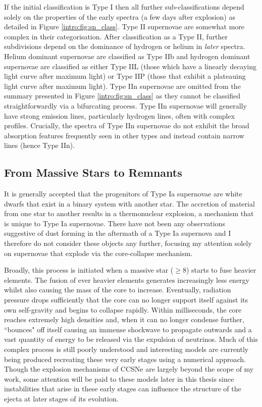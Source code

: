 If the initial classification is Type I then all further sub-classifications depend solely on the properties of the early spectra (a few days after explosion) as detailed in Figure \ref{intro:fig:sn_class}.  Type II supernovae are somewhat more complex in their categorisation.  After classification as a Type II, further subdivisions depend on the dominance of hydrogen or helium in \textit{later} spectra.  Helium dominant supernovae are classified as Type IIb and hydrogen dominant supernovae are classified as either Type IIL (those which have a linearly decaying light curve after maximum light) or Type IIP (those that exhibit a plateauing light curve after maximum light).  Type IIn supernovae are omitted from the summary presented in Figure \ref{intro:fig:sn_class} as they cannot be classified straightforwardly via a bifurcating process.  Type IIn supernovae will generally have strong emission lines, particularly hydrogen lines, often with complex profiles.  Crucially, the spectra of Type IIn supernovae do not exhibit the broad absorption features frequently seen in other types and instead contain narrow lines (hence Type IIn).  

\subsection{From Massive Stars to Remnants}

It is generally accepted that the progenitors of Type Ia supernovae are white dwarfs that exist in a binary system with another star.  The accretion of material from one star to another results in a thermonuclear explosion, a mechanism that is unique to Type Ia supernovae.  There have not been any observations suggestive of dust forming in the aftermath of a Type Ia supernova and I therefore do not consider these objects any further, focusing my attention solely on supernovae that explode via the core-collapse mechanism.  

Broadly, this process is initiated when a massive star ($\ge 8$\msun) starts to fuse heavier elements. The fusion of ever heavier elements generates increasingly less energy whilst also causing the mass of the core to increase.  Eventually, radiation pressure drops sufficiently that the core can no longer support itself against its own self-gravity and begins to collapse rapidly. Within milliseconds, the core reaches extremely high densities and, when it can no longer condense further, ``bounces" off itself causing  an immense shockwave to propagate outwards and a vast quantity of energy to be released via the expulsion of neutrinos.  Much of this complex process is still poorly understood and interesting models are currently being produced recreating these very early stages using a numerical approach.  Though the explosion mechanisms of CCSNe are largely beyond the scope of my work, some attention will be paid to these models later in this thesis since instabilities that arise in these early stages can influence the structure of the ejecta at later stages of its evolution.

